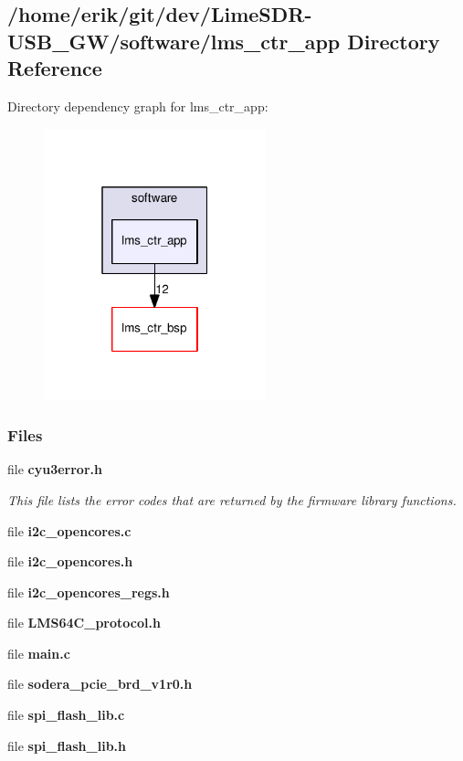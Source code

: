 \subsection{/home/erik/git/dev/\+Lime\+S\+D\+R-\/\+U\+S\+B\+\_\+\+G\+W/software/lms\+\_\+ctr\+\_\+app Directory Reference}
\label{dir_22b4706dccd7899311df61e30c199be2}
Directory dependency graph for lms\+\_\+ctr\+\_\+app\+:
\nopagebreak
\begin{figure}[H]
\begin{center}
\leavevmode
\includegraphics[width=182pt]{dir_22b4706dccd7899311df61e30c199be2_dep}
\end{center}
\end{figure}
\subsubsection*{Files}
\begin{DoxyCompactItemize}
\item 
file {\bf cyu3error.\+h}
\begin{DoxyCompactList}\small\item\em This file lists the error codes that are returned by the firmware library functions. \end{DoxyCompactList}\item 
file {\bf i2c\+\_\+opencores.\+c}
\item 
file {\bf i2c\+\_\+opencores.\+h}
\item 
file {\bf i2c\+\_\+opencores\+\_\+regs.\+h}
\item 
file {\bf L\+M\+S64\+C\+\_\+protocol.\+h}
\item 
file {\bf main.\+c}
\item 
file {\bf sodera\+\_\+pcie\+\_\+brd\+\_\+v1r0.\+h}
\item 
file {\bf spi\+\_\+flash\+\_\+lib.\+c}
\item 
file {\bf spi\+\_\+flash\+\_\+lib.\+h}
\end{DoxyCompactItemize}
